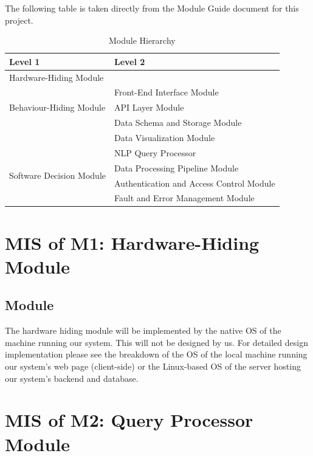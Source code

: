 \documentclass[12pt, titlepage]{article}
\begin{document}
The following table is taken directly from the Module Guide document for this project.

\begin{table}[h!]
  \centering
  \begin{tabular}{p{} p{}}
  \toprule
  \textbf{Level 1} & \textbf{Level 2}\\
  \midrule
  
  {Hardware-Hiding Module} & ~ \\
  \midrule
  
  \multirow{3}{0.3\textwidth}{Behaviour-Hiding Module} & Front-End Interface Module\\
  & API Layer Module\\
  & Data Schema and Storage Module\\
  & Data Visualization Module\\
  \midrule
  
  \multirow{4}{0.3\textwidth}{Software Decision Module} & NLP Query Processor \\
  & Data Processing Pipeline Module\\
  & Authentication and Access Control Module\\
  & Fault and Error Management Module\\
  \bottomrule
  
  \end{tabular}
  \caption{Module Hierarchy}
  \label{TblMH}
  \end{table}
\newpage

\section{MIS of M1: Hardware-Hiding Module} \label{Module 1}

\subsection{Module}

\par{The hardware hiding module will be implemented by the native OS of the machine running our system. This will not be designed by us. For
detailed design implementation please see the breakdown of the OS of the local machine running our system's web page (client-side) or the 
Linux-based OS of the server hosting our system's backend and database.}

\section{MIS of M2: Query Processor Module} \label{Module 2}
\end{document}
